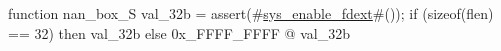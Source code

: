 function nan_box_S val_32b = {
  assert(#\hyperref[sailRISCVzsyszyenablezyfdext]{sys\_enable\_fdext}#());
  if (sizeof(flen) == 32)
  then val_32b
  else 0x_FFFF_FFFF @ val_32b
}
